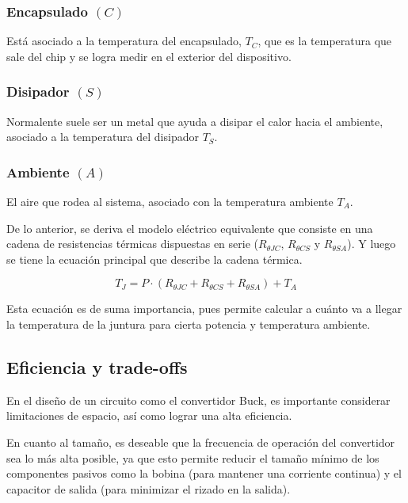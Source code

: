 \documentclass[journal]{IEEEtran}
\begin{document}
    \subsubsection{Encapsulado \emph{$(C)$}}
    Está asociado a la temperatura del encapsulado, \emph{$T_C$}, que 
    es la temperatura que sale del chip y se logra medir en el exterior del dispositivo.

    \subsubsection{Disipador \emph{$(S)$}}
    Normalente suele ser un metal que ayuda a disipar el calor hacia el ambiente, 
    asociado a la temperatura del disipador \emph{$T_S$}.

    \subsubsection{Ambiente \emph{$(A)$}}
    El aire que rodea al sistema, asociado con
    la temperatura ambiente \emph{$T_A$}.

\setlength{\parskip}{1em}

De lo anterior, se deriva el modelo eléctrico equivalente que consiste en una cadena de 
resistencias térmicas dispuestas en serie (\emph{$R_{\theta JC}$}, \emph{$R_{\theta CS}$} y \emph{$R_{\theta SA}$}).
Y luego se tiene la ecuación principal que describe la cadena térmica.

\begin{equation}
    T_J = P \cdot (R_{\theta JC} + R_{\theta CS} + R_{\theta SA}) + T_A
\end{equation}

Esta ecuación es de suma importancia, pues permite calcular a cuánto va a llegar la temperatura de la juntura
para cierta potencia y temperatura ambiente. 


\subsection{Eficiencia y trade-offs}
En el diseño de un circuito como el convertidor Buck, es importante considerar
limitaciones de espacio, así como lograr una alta eficiencia.

\setlength{\parskip}{1em}

En cuanto al tamaño, es deseable que la frecuencia de operación del convertidor
sea lo más alta posible, ya que esto permite reducir el tamaño mínimo de los componentes 
pasivos como la bobina (para mantener una corriente continua) y el capacitor de salida 
(para minimizar el rizado en la salida).
\end{document}
